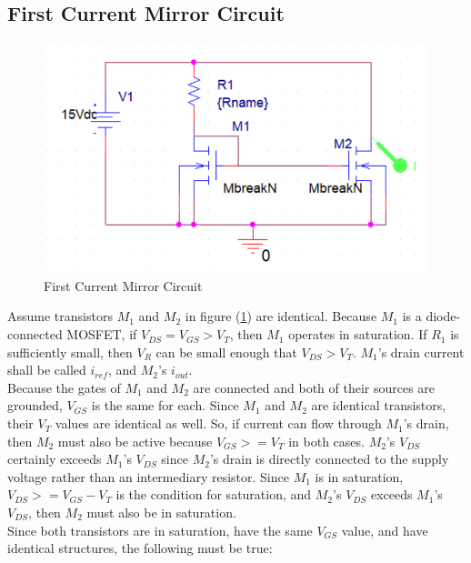 \subsection{First Current Mirror Circuit}
\FloatBarrier

\begin{figure}[h!]
	\centering
	\includegraphics[scale=0.75]{./images/circuit4.PNG}
	\caption{First Current Mirror Circuit}
	\label{fig:circuit4}
\end{figure}

\FloatBarrier

Assume transistors $M_1$ and $M_2$ in figure (\ref{fig:circuit4}) are identical. Because $M_1$ is a diode-connected MOSFET, if $V_{DS} = V_{GS} > V_T$, then $M_1$ operates in saturation. If $R_1$ is sufficiently small, then $V_R$ can be small enough that $V_{DS} > V_T$. $M_1$'s drain current shall be called $i_{ref}$, and $M_2$'s $i_{out}$. \\

Because the gates of $M_1$ and $M_2$ are connected and both of their sources are grounded, $V_{GS}$ is the same for each. Since $M_1$ and $M_2$ are identical transistors, their $V_{T}$ values are identical as well. So, if current can flow through $M_1$'s drain, then $M_2$ must also be active because $V_{GS} >= V_{T}$ in both cases. $M_2$'s $V_{DS}$ certainly exceeds $M_1$'s $V_{DS}$ since $M_2$'s drain is directly connected to the supply voltage rather than an intermediary resistor. Since $M_1$ is in saturation, $V_{DS} >= V_{GS} - V_{T}$ is the condition for saturation, and $M_2$'s $V_{DS}$ exceeds $M_1$'s $V_{DS}$, then $M_2$ must also be in saturation. \\

Since both transistors are in saturation, have the same $V_{GS}$ value, and have identical structures, the following must be true:

